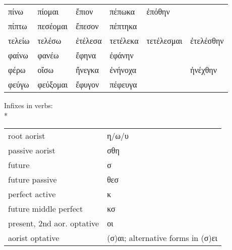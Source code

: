 \begin{small}
{\begin{tabular}{llllll}
πίνω  &  πίομαι  &  ἔπιον  &  πέπωκα  &  ἐπόθην        \\
πίπτω  &  πεσέομαι  &  ἔπεσον  &  πέπτηκα        \\
τελείω  &  τελέσω  &  ἐτέλεσα  &  τετέλεκα  &  τετέλεσμαι  &  ἐτελέσθην        \\
φαίνω  &  φανέω  &  ἔφηνα  &  ἐφάνην        \\
φέρω  &  οἴσω  &  ἤνεγκα  &  ἐνήνοχα  &    &  ἠνέχθην        \\
φεύγω  &  φεύξομαι  &  ἔφυγον  &  πέφευγα        \\
\end{tabular}

}

\end{small}

\pagebreak

Infixes in verbs:\\*
%
\begin{tabular}{ll}
root aorist         & η/ω/υ \\
passive aorist      & σθη \\
future              & σ \\
future passive      & θεσ \\
perfect active      & κ \\
future middle perfect & κσ \\
present, 2nd aor. optative    & οι \\
aorist optative     & (σ)αι; alternative forms in (σ)ει\\
\end{tabular}

